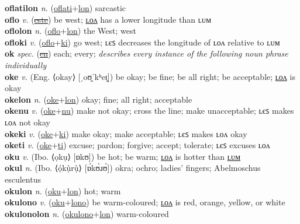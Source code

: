 \textbf{oflatilon} \textit{n.} (\hyperref[oflati]{oflati}+\hyperref[lon]{lon})
sarcastic \label{oflatilon} \\
\textbf{oflo} \textit{v.} (\hyperref[este]{\sout{este}})
be west; \hyperref[oflolon]{ʟᴏᴧ} has a lower longitude than ʟᴜᴍ \label{oflo} \\
\textbf{oflolon} \textit{n.} (\hyperref[oflo]{oflo}+\hyperref[lon]{lon})
the West; west \label{oflolon} \\
\textbf{ofloki} \textit{v.} (\hyperref[oflo]{oflo}+\hyperref[ki]{ki})
go west; ʟєꜱ decreases the longitude of ʟᴏᴧ relative to ʟᴜᴍ \label{ofloki} \\
\textbf{ok} \textit{spec.} (\hyperref[en]{\sout{en}})
each; every; \textit{describes every instance of the following noun phrase individually} \label{ok} \\
\textbf{oke} \textit{v.} (Eng. ⟨okay⟩ [ˌoʊ̯ˈkʰeɪ̯])
be okay; be fine; be all right; be acceptable; \hyperref[okelon]{ʟᴏᴧ} is okay \label{oke} \\
\textbf{okelon} \textit{n.} (\hyperref[oke]{oke}+\hyperref[lon]{lon})
okay; fine; all right; acceptable \label{okelon} \\
\textbf{okenu} \textit{v.} (\hyperref[oke]{oke}+\hyperref[nu]{nu})
make not okay; cross the line; make unacceptable; ʟєꜱ makes ʟᴏᴧ not okay \label{okenu} \\
\textbf{okeki} \textit{v.} (\hyperref[oke]{oke}+\hyperref[ki]{ki})
make okay; make acceptable; ʟєꜱ makes ʟᴏᴧ okay \label{okeki} \\
\textbf{oketi} \textit{v.} (\hyperref[oke]{oke}+\hyperref[ti]{ti})
excuse; pardon; forgive; accept; tolerate; ʟєꜱ excuses ʟᴏᴧ \label{oketi} \\
\textbf{oku} \textit{v.} (Ibo. ⟨ọkụ⟩ [ɒkʊ])
be hot; be warm; \hyperref[okulon]{ʟᴏᴧ} is hotter than \hyperref[okulum]{ʟᴜᴍ} \label{oku} \\
\textbf{okul} \textit{n.} (Ibo. ⟨ọ́kụ̀rụ̀⟩ [ɒ́kʊ̀ɹʊ̀])
okra; ochro; ladies’ fingers; Abelmoschus esculentus \label{okul} \\
\textbf{okulon} \textit{n.} (\hyperref[oku]{oku}+\hyperref[lon]{lon})
hot; warm \label{okulon} \\
\textbf{okulono} \textit{v.} (\hyperref[oku]{oku}+\hyperref[lono]{lono})
be warm-coloured; \hyperref[okulonolon]{ʟᴏᴧ} is red, orange, yellow, or white \label{okulono} \\
\textbf{okulonolon} \textit{n.} (\hyperref[okulono]{okulono}+\hyperref[lon]{lon})
warm-coloured \label{okulonolon} \\
